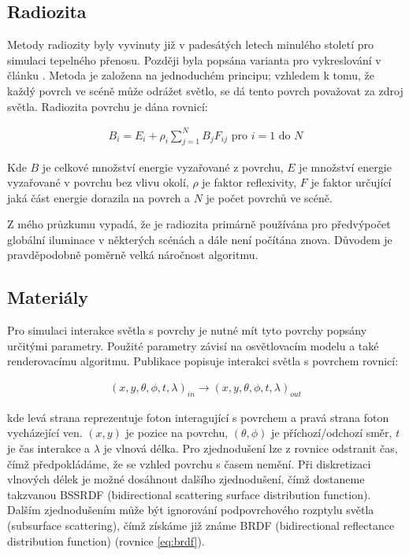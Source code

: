 \subsection{Radiozita}
Metody radiozity byly vyvinuty již v padesátých letech minulého století pro simulaci tepelného přenosu. Později byla popsána varianta pro vykreslování v článku \cite{radiosity}. Metoda je založena na jednoduchém principu; vzhledem k tomu, že každý povrch ve scéně může odrážet světlo, se dá tento povrch považovat za zdroj světla. Radiozita povrchu je dána rovnicí:


\begin{equation} \label{eq:voxel_coords}
	\begin{gathered}
		B_i = E_i + \rho_i \sum^N_{j = 1}B_jF_{ij} \text{ pro } i = 1 \text{ do } N
	\end{gathered}
\end{equation}

Kde $B$ je celkové množství energie vyzařované z povrchu, $E$ je množství energie vyzařované v povrchu bez vlivu okolí, $\rho$ je faktor reflexivity, $F$ je faktor určující jaká část energie dorazila na povrch a $N$ je počet povrchů ve scéně.

Z mého průzkumu vypadá, že je radiozita primárně používána pro předvýpočet globální iluminace v některých scénách a dále není počítána znova. Důvodem je pravděpodobně poměrně velká náročnost algoritmu.

\subsection{Materiály}
Pro simulaci interakce světla s povrchy je nutné mít tyto povrchy popsány určitými parametry. Použité parametry závisí na osvětlovacím modelu a také renderovacímu algoritmu. Publikace \cite{materials} popisuje interakci světla s povrchem rovnicí:

\begin{equation} \label{eq:surface_photon}
	\begin{gathered}
		(x, y, \theta, \phi, t, \lambda)_{in} \xrightarrow{} (x, y, \theta, \phi, t, \lambda)_{out}
	\end{gathered}
\end{equation}

kde levá strana reprezentuje foton interagující s povrchem a pravá strana foton vycházející ven. $(x, y)$ je pozice na povrchu, $(\theta, \phi)$ je příchozí/odchozí směr, $t$ je čas interakce a $\lambda$ je vlnová délka. Pro zjednodušení lze z rovnice odstranit čas, čímž předpokládáme, že se vzhled povrchu s časem nemění. Při diskretizaci vlnových délek je možné dosáhnout dalšího zjednodušení, čímž dostaneme takzvanou BSSRDF (bidirectional scattering surface distribution function). Dalším zjednodušením může být ignorování podpovrchového rozptylu světla (subsurface scattering), čímž získáme již známe BRDF (bidirectional reflectance distribution function) (rovnice \ref{eq:brdf}).

